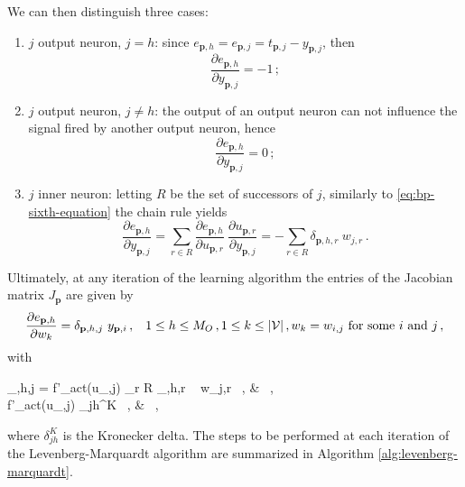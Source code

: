 \documentclass[12pt, a4paper, twoside, openright]{report}
\numberwithin{equation}{chapter}
\theoremstyle{theorem}
\theoremstyle{definition}
\theoremstyle{remark}
\theoremstyle{proposition}
\numberwithin{figure}{chapter}
\begin{document}
		We can then distinguish three cases:
		\begin{enumerate}[label=(\roman*)]
			\item $j$ output neuron, $j = h$: since $e_{\mathbf{p},h} = e_{\mathbf{p},j} = t_{\mathbf{p},j} - y_{\mathbf{p},j}$, then 
			\begin{equation}
				\label{eq:jacobian-first-case}
				\dfrac{\partial e_{\mathbf{p},h}}{\partial y_{\mathbf{p},j}} = -1 \, ;
			\end{equation}
			\item $j$ output neuron, $j \neq h$: the output of an output neuron can not influence the signal fired by another output neuron, hence 
			\begin{equation}
				\label{eq:jacobian-second-case}
				\dfrac{\partial e_{\mathbf{p},h}}{\partial y_{\mathbf{p},j}} = 0 \, ;
			\end{equation}
			\item $j$ inner neuron: letting $R$ be the set of successors of $j$, similarly to \eqref{eq:bp-sixth-equation} the chain rule yields
			\begin{equation}
				\label{eq:jacobian-third-case}
				\dfrac{\partial e_{\mathbf{p},h}}{\partial y_{\mathbf{p},j}} = \sum_{r \in R} \dfrac{\partial e_{\mathbf{p},h}}{\partial u_{\mathbf{p},r}} ~ \dfrac{\partial u_{\mathbf{p},r}}{\partial y_{\mathbf{p},j}} = - \sum_{r \in R} \delta_{\mathbf{p},h,r} ~ w_{j,r} \, .
			\end{equation}
		\end{enumerate}
		
		Ultimately, at any iteration of the learning algorithm the entries of the Jacobian matrix $J_{\mathbf{p}}$ are given by
		\begin{equation*}
			\dfrac{\partial e_{\mathbf{p},h}}{\partial w_k} = \delta_{\mathbf{p},h,j} ~ y_{\mathbf{p},i} \, , \hspace*{0.3cm} 1 \leq h \leq M_O \, , 1 \leq k \leq |\mathcal{V}| \, , \text{$w_k = w_{i,j}$ for some $i$ and $j$} \, ,
		\end{equation*}
		with
		\begin{subnumcases}{\delta_{,h,j} =}
			\label{eq:levenberg-marquardt-inner-neuron}
		   	f'_{act}(u_{,j}) \sum_{r \in R} \delta_{,h,r} ~ w_{j,r} \, , &  \, , \\
		   	\label{eq:levenberg-marquardt-output-neuron}
			f'_{act}(u_{,j}) \delta_{jh}^K \, , &  \, ,
		\end{subnumcases}
		where $\delta_{jh}^K$ is the Kronecker delta. The steps to be performed at each iteration of the Levenberg-Marquardt algorithm are summarized in Algorithm \ref{alg:levenberg-marquardt}.
		
\end{document}
